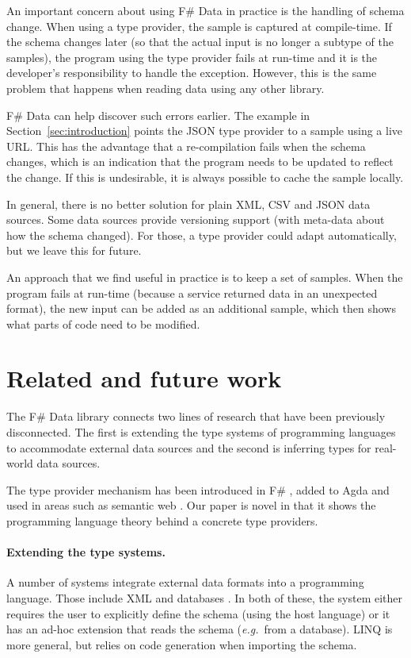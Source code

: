 \documentclass[10pt,preprint,clearpagebib]{sigplanconf}
\begin{document}
An important concern about using F\# Data in practice is the handling of schema change. When using a
type provider, the sample is captured at compile-time. If the schema changes later (so that the actual
input is no longer a subtype of the samples), the program using the type provider fails at run-time
and it is the developer's responsibility to handle the exception. However, this is the same problem that
happens when reading data using any other library.

F\# Data can help discover such errors earlier. The example in Section~\ref{sec:introduction}
points the JSON type provider to a sample using a live URL. This has the advantage that a re-compilation 
fails when the schema changes, which is an indication that the program needs to be updated to reflect the
change. If this is undesirable, it is always possible to cache the sample locally.

In general, there is no better solution for plain XML, CSV and JSON data sources. Some data sources provide 
versioning support (with meta-data about how the schema changed). For those, a type 
provider could adapt automatically, but we leave this for future.

An approach that we find useful in practice is to keep a set of samples. When the program fails at run-time
(because a service returned data in an unexpected format), the new input can be added as an additional sample,
which then shows what parts of code need to be modified.


\section{Related and future work}
\label{sec:related}

The F\# Data library connects two lines of research that have been previously disconnected. The first is 
extending the type systems of programming languages to accommodate external data sources and the second
is inferring types for real-world data sources.

The type provider mechanism has been introduced in F\# \cite{fsharp-typeprov,fsharp-typeprov-ddfp}, 
added to Agda \cite{agda-tp} and used in areas such as semantic web \cite{liteq}. Our paper is novel 
in that it shows the programming language theory behind a concrete type providers. 

\paragraph{Extending the type systems.} 
A number of systems integrate external data formats into a programming language. Those include 
XML \cite{xduce,xduce-ml} and databases \cite{links}. In both of these, the system either requires
the user to explicitly define the schema (using the host language) or it has an ad-hoc extension 
that reads the schema (\emph{e.g.}~from a database). LINQ \cite{linq} is more general, but relies
on code generation when importing the schema.
\end{document}
